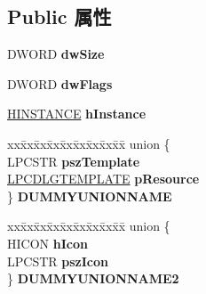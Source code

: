 \subsection*{Public 属性}
\begin{DoxyCompactItemize}
\item 
\mbox{\label{struct___p_r_o_p_s_h_e_e_t_p_a_g_e_a_ae1d349da4b9020d0f6854ff1f6c6e8fa}} 
D\+W\+O\+RD {\bfseries dw\+Size}
\item 
\mbox{\label{struct___p_r_o_p_s_h_e_e_t_p_a_g_e_a_a0733390f8b2f78e86e44984ba2f15c32}} 
D\+W\+O\+RD {\bfseries dw\+Flags}
\item 
\mbox{\label{struct___p_r_o_p_s_h_e_e_t_p_a_g_e_a_ab2807cdea5986fe7cd073e64d7cc4494}} 
\hyperlink{interfacevoid}{H\+I\+N\+S\+T\+A\+N\+CE} {\bfseries h\+Instance}
\item 
\mbox{\label{struct___p_r_o_p_s_h_e_e_t_p_a_g_e_a_a8d517d4d8eef6c8e1196e0436b3d7925}} 
\begin{tabbing}
xx\=xx\=xx\=xx\=xx\=xx\=xx\=xx\=xx\=\kill
union \{\\
\>LPCSTR {\bfseries pszTemplate}\\
\>\hyperlink{struct_d_l_g_t_e_m_p_l_a_t_e}{LPCDLGTEMPLATE} {\bfseries pResource}\\
\} {\bfseries DUMMYUNIONNAME}\\

\end{tabbing}\item 
\mbox{\label{struct___p_r_o_p_s_h_e_e_t_p_a_g_e_a_aea9c0e3d4752108ec9c0a16963a513f8}} 
\begin{tabbing}
xx\=xx\=xx\=xx\=xx\=xx\=xx\=xx\=xx\=\kill
union \{\\
\>HICON {\bfseries hIcon}\\
\>LPCSTR {\bfseries pszIcon}\\
\} {\bfseries DUMMYUNIONNAME2}\\


\end{tabbing}
\end{DoxyCompactItemize}
